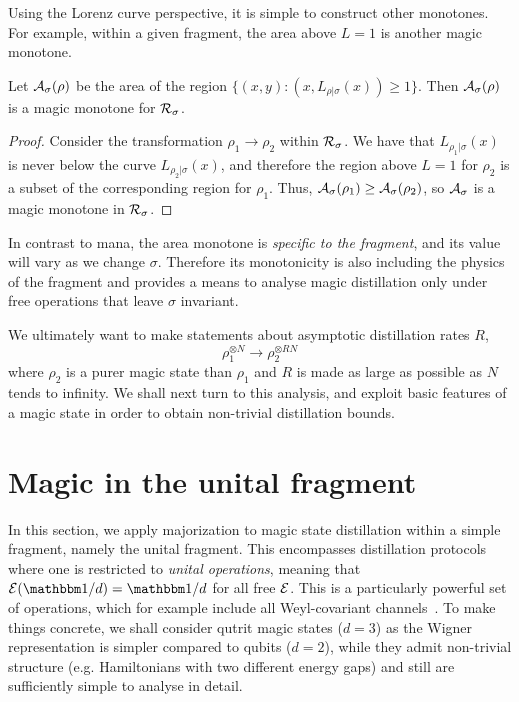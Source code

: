 \documentclass[pra,
aps,
twocolumn,
superscriptaddress,
groupedaddress,
nofootinbib,
reprint
]{revtex4-1}
\begin{document}
Using the Lorenz curve perspective, it is simple to construct other monotones. For example, within a given fragment, the area above $L=1$ is another magic monotone.
\begin{lemma} Let ${\mathcal A}_\sigma(\rho)$ be the area of the region $\{(x,y) : (x, L_{\rho | \sigma}(x)) \ge 1\}$. Then ${\mathcal A}_\sigma(\rho)$ is a magic monotone for $\mathcal{R}_\sigma$.
\end{lemma}
\begin{proof}
Consider the transformation $\rho_1 \rightarrow \rho_2$ within $\mathcal{R}_\sigma$. We have that $L_{\rho_1|\sigma}(x)$ is never below the curve $L_{\rho_2|\sigma}(x)$, and therefore the region above $L=1$ for $\rho_2$ is a subset of the corresponding region for $\rho_1$. Thus, ${\mathcal A}_\sigma(\rho_1) \geq {\mathcal A}_\sigma(\rho_2)$, so ${\mathcal A}_\sigma$ is a magic monotone in $\mathcal{R}_\sigma$.
\end{proof}
In contrast to mana, the area monotone is \emph{specific to the fragment}, and its value will vary as we change $\sigma$. Therefore its monotonicity is also including the physics of the fragment and provides a means to analyse magic distillation only under free operations that leave $\sigma$ invariant.

We ultimately want to make statements about asymptotic distillation rates $R$,
\begin{equation}
\rho_1^{\otimes N} \longrightarrow \rho_2^{\otimes R N}
\end{equation}
where $\rho_2$ is a purer magic state than $\rho_1$ and $R$ is made as large as possible as $N$ tends to infinity. We shall next turn to this analysis, and exploit basic features of a magic state in order to obtain non-trivial distillation bounds.


\section{Magic in the unital fragment}
\label{sec:unital}

In this section, we apply majorization to magic state distillation within a simple fragment, namely the unital fragment. This encompasses distillation protocols where one is restricted to \emph{unital operations}, meaning that $\E(\I/d) = \I/d$ for all free $\mathcal{E}$. This is a particularly powerful set of operations, which for example include all Weyl-covariant channels~\cite{cit:gross3}. To make things concrete, we shall consider qutrit magic states ($d=3$) as the Wigner representation is simpler compared to qubits ($d=2$), while they admit non-trivial structure (e.g. Hamiltonians with two different energy gaps) and still are sufficiently simple to analyse in detail.
\end{document}
